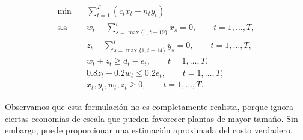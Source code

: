 \[
\begin{aligned}
\text{min} \quad & \sum_{t=1}^{T} \left(c_t x_t + n_t y_t\right) \\
\text{s.a} \quad
& w_t - \sum_{s=\max\{1,t-19\}}^{t} x_s = 0, \qquad t=1,\ldots,T, \\
& z_t - \sum_{s=\max\{1,t-14\}}^{t} y_s = 0, \qquad t=1,\ldots,T, \\
& w_t + z_t \ge d_t - e_t, \qquad t=1,\ldots,T, \\
& 0.8z_t - 0.2w_t \le 0.2e_t, \qquad t=1,\ldots,T, \\
& x_t, y_t, w_t, z_t \ge 0, \qquad t=1,\ldots,T.
\end{aligned}
\]

Observamos que esta formulación no es completamente realista, porque ignora ciertas economías de escala que pueden favorecer plantas de mayor tamaño. Sin embargo, puede proporcionar una estimación aproximada del costo verdadero.
